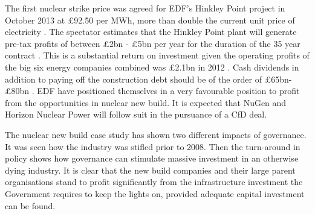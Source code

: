 The first nuclear strike price was agreed for EDF's Hinkley Point project in October 2013 at \pounds92.50 per MWh, more than double the current unit price of electricity \cite{BBCnewsHinkley}. 
The spectator estimates that the Hinkley Point plant will generate pre-tax profits of between \pounds2bn - \pounds5bn per year for the duration of the 35 year contract \cite{Spectator14}.
This is a substantial return on investment given the operating profits of the big six energy companies combined was \pounds2.1bn in 2012 \cite{Spectator14}.
Cash dividends in addition to paying off the construction debt should be of the order of \pounds65bn-\pounds80bn \cite{Spectator14}.
EDF have positioned themselves in a very favourable position to profit from the opportunities in nuclear new build.
It is expected that NuGen and Horizon Nuclear Power will follow suit in the pursuance of a CfD deal.

The nuclear new build case study has shown two different impacts of governance. 
It was seen how the industry was stifled prior to 2008. 
Then the turn-around in policy shows how governance can stimulate massive investment in an otherwise dying industry.
It is clear that the new build companies and their large parent organisations stand to profit significantly from the infrastructure investment the Government requires to keep the lights on, provided adequate capital investment can be found.
